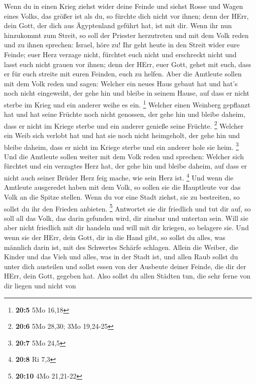  Wenn du in einen Krieg ziehst wider deine Feinde und
siehst Rosse und Wagen eines Volks, das größer ist als du, so fürchte
dich nicht vor ihnen; denn der HErr, dein Gott, der dich aus Ägyptenland
geführt hat, ist mit dir.  Wenn ihr nun hinzukommt zum
Streit, so soll der Priester herzutreten und mit dem Volk reden
 und zu ihnen sprechen: Israel, höre zu! Ihr geht heute in
den Streit wider eure Feinde; euer Herz verzage nicht, fürchtet euch
nicht und erschreckt nicht und lasst euch nicht grauen vor ihnen;
 denn der HErr, euer Gott, gehet mit euch, dass er für
euch streite mit euren Feinden, euch zu helfen.  Aber die
Amtleute sollen mit dem Volk reden und sagen: Welcher ein neues Haus
gebaut hat und hat's noch nicht eingeweiht, der gehe hin und bleibe in
seinem Hause, auf dass er nicht sterbe im Krieg und ein anderer weihe es
ein. \footnote{\textbf{20:5} 5Mo 16,18}  Welcher einen
Weinberg gepflanzt hat und hat seine Früchte noch nicht genossen, der
gehe hin und bleibe daheim, dass er nicht im Kriege sterbe und ein
anderer genieße seine Früchte. \footnote{\textbf{20:6} 5Mo 28,30; 3Mo
  19,24-25}  Welcher ein Weib sich verlobt hat und hat sie
noch nicht heimgeholt, der gehe hin und bleibe daheim, dass er nicht im
Kriege sterbe und ein anderer hole sie heim. \footnote{\textbf{20:7} 5Mo
  24,5}  Und die Amtleute sollen weiter mit dem Volk reden
und sprechen: Welcher sich fürchtet und ein verzagtes Herz hat, der gehe
hin und bleibe daheim, auf dass er nicht auch seiner Brüder Herz feig
mache, wie sein Herz ist. \footnote{\textbf{20:8} Ri 7,3} 
Und wenn die Amtleute ausgeredet haben mit dem Volk, so sollen sie die
Hauptleute vor das Volk an die Spitze stellen.  Wenn du
vor eine Stadt ziehst, sie zu bestreiten, so sollst du ihr den Frieden
anbieten. \footnote{\textbf{20:10} 4Mo 21,21-22} 
Antwortet sie dir friedlich und tut dir auf, so soll all das Volk, das
darin gefunden wird, dir zinsbar und untertan sein.  Will
sie aber nicht friedlich mit dir handeln und will mit dir kriegen, so
belagere sie.  Und wenn sie der HErr, dein Gott, dir in
die Hand gibt, so sollst du alles, was männlich darin ist, mit des
Schwertes Schärfe schlagen.  Allein die Weiber, die
Kinder und das Vieh und alles, was in der Stadt ist, und allen Raub
sollst du unter dich austeilen und sollst essen von der Ausbeute deiner
Feinde, die dir der HErr, dein Gott, gegeben hat.  Also
sollst du allen Städten tun, die sehr ferne von dir liegen und nicht von
